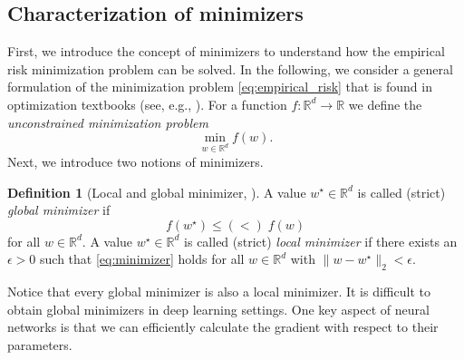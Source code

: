 \documentclass[12pt]{article}
\theoremstyle{definition}
\newtheorem{definition}[definition]{Definition}
\numberwithin{equation}{section}
\newcommand{\R}{\mathbb{R}}
\newcommand{\norm}[1]{\lVert{#1}\rVert_2}
\begin{document}
\subsection{Characterization of minimizers}
First, we introduce the concept of minimizers to understand how the empirical risk minimization problem can be solved. In the following, we consider a general formulation of the minimization problem \eqref{eq:empirical_risk} that is found in optimization textbooks (see, e.g., \cite{nocedalNumericalOptimization2006}). For a function $f:\R^d \rightarrow \R$ we define the \emph{unconstrained minimization problem}
\begin{equation}
  \min_{w \in \R^d} f(w).
\end{equation}
Next, we introduce two notions of minimizers.
\begin{definition}[Local and global minimizer, ]
  A value $w^\star \in \R^d$ is called (strict) \emph{global minimizer} if 
  \begin{equation}
    \label{eq:minimizer}
    f(w^\star) \leq (<) \; f(w)
  \end{equation} 
  for all $w \in \R^d$. A value $w^\star \in \R^d$ is called (strict) \emph{local minimizer} if there exists an $\epsilon > 0$ such that \eqref{eq:minimizer} holds for all $w \in \R^d$ with $\norm{w-w^\star} < \epsilon$.
\end{definition}
Notice that every global minimizer is also a local minimizer. It is difficult to obtain global minimizers in deep learning settings. One key aspect of neural networks is that we can efficiently calculate the gradient with respect to their parameters. 
\end{document}

